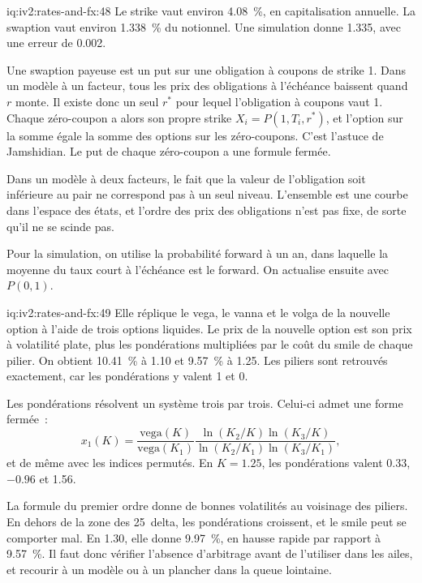 \begin{solution}{iq:iv2:rates-and-fx:48}
Le strike vaut environ 4.08~\%, en capitalisation annuelle. La swaption vaut environ 1.338~\% du notionnel. Une simulation donne 1.335, avec une erreur de 0.002.

Une swaption payeuse est un put sur une obligation à coupons de strike 1. Dans un modèle à un facteur, tous les prix des obligations à l'échéance baissent quand $r$ monte. Il existe donc un seul $r^*$ pour lequel l'obligation à coupons vaut 1. Chaque zéro-coupon a alors son propre strike $X_i = P(1, T_i, r^*)$, et l'option sur la somme égale la somme des options sur les zéro-coupons. C'est l'astuce de Jamshidian. Le put de chaque zéro-coupon a une formule fermée.

Dans un modèle à deux facteurs, le fait que la valeur de l'obligation soit inférieure au pair ne correspond pas à un seul niveau. L'ensemble est une courbe dans l'espace des états, et l'ordre des prix des obligations n'est pas fixe, de sorte qu'il ne se scinde pas.

Pour la simulation, on utilise la probabilité forward à un an, dans laquelle la moyenne du taux court à l'échéance est le forward. On actualise ensuite avec $P(0, 1)$.

\end{solution}

\begin{solution}{iq:iv2:rates-and-fx:49}
Elle réplique le vega, le vanna et le volga de la nouvelle option à l'aide de trois options liquides. Le prix de la nouvelle option est son prix à volatilité plate, plus les pondérations multipliées par le coût du smile de chaque pilier. On obtient 10.41~\% à 1.10 et 9.57~\% à 1.25. Les piliers sont retrouvés exactement, car les pondérations y valent 1 et 0.

Les pondérations résolvent un système trois par trois. Celui-ci admet une forme fermée~:
\[
x_1(K) = \frac{\text{vega}(K)}{\text{vega}(K_1)}\frac{\ln(K_2/K)\ln(K_3/K)}{\ln(K_2/K_1)\ln(K_3/K_1)},
\]
et de même avec les indices permutés. En $K = 1.25$, les pondérations valent 0.33, $-0.96$ et 1.56.

La formule du premier ordre donne de bonnes volatilités au voisinage des piliers. En dehors de la zone des 25~delta, les pondérations croissent, et le smile peut se comporter mal. En 1.30, elle donne 9.97~\%, en hausse rapide par rapport à 9.57~\%. Il faut donc vérifier l'absence d'arbitrage avant de l'utiliser dans les ailes, et recourir à un modèle ou à un plancher dans la queue lointaine.

\end{solution}


